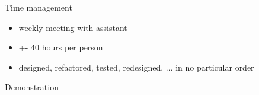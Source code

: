 \documentclass[10pt]{beamer}
\begin{document}

\begin{frame}[fragile]{Time management}
\begin{itemize}
\item weekly meeting with assistant
\item +- 40 hours per person
\item designed, refactored, tested, redesigned, ... in no particular order
\end{itemize}
\end{frame}

{
\begin{frame}[standout]
  Demonstration
\end{frame}
}
\end{document}
